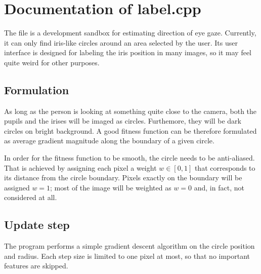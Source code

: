 \documentclass[12pt]{article}
\begin{document}
\section*{Documentation of label.cpp}

The file is a development sandbox for estimating direction of eye gaze.
Currently, it can only find iris-like circles around an area selected by the user.
Its user interface is designed for labeling the iris position in many images, so it may feel quite weird for other purposes.

\subsection*{Formulation}

As long as the person is looking at something quite close to the camera, both the pupils and the irises will be imaged as circles.
Furthemore, they will be dark circles on bright background.
A good fitness function can be therefore formulated as average gradient magnitude along the boundary of a given circle.

In order for the fitness function to be smooth, the circle needs to be anti-aliased.
That is achieved by assigning each pixel a weight $w \in [0, 1]$ that corresponds to its distance from the circle boundary.
Pixels exactly on the boundary will be assigned $w = 1$; most of the image will be weighted as $w = 0$ and, in fact, not considered at all.

\subsection*{Update step}

The program performs a simple gradient descent algorithm on the circle position and radius.
Each step size is limited to one pixel at most, so that no important features are skipped.
\end{document}
